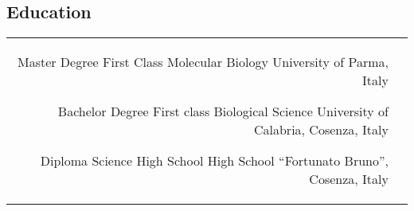\documentclass[10pt]{article} %
\begin{document}
\begin{paracol}{2}
\pagebreak
\section{Education} 





\begin{supertabular}{rl} %

	
	{Master Degree} %
	{First Class} %
	{Molecular Biology} %
	{University of Parma, Italy} %
	
	
	{Bachelor Degree} %
	{First class} %
	{Biological Science} %
	{University of Calabria, Cosenza, Italy} %
	
	
	{Diploma} %
	{} %
	{Science High School} %
	{High School “Fortunato Bruno”, Cosenza, Italy} %
	

\end{supertabular}




\end{paracol}
\end{document}
